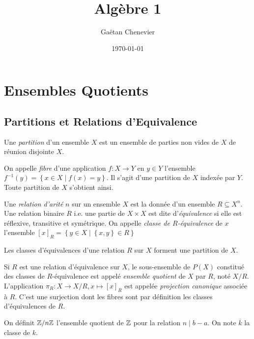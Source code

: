 \documentclass{cours}
\title{Algèbre 1}
\author{Gaëtan Chenevier}
\date{\today}
\begin{document}
\newpage
\section{Ensembles Quotients}
\subsection{Partitions et Relations d'Equivalence}
\begin{definition}
    Une \emph{partition} d'un ensemble $X$ est un ensemble de parties non vides de $X$ de réunion disjointe $X$. 
\end{definition}
\begin{definition}
    On appelle \emph{fibre} d'une application $f : X \rightarrow Y$ en $y \in Y$ l'ensemble $f^{-1}(y) = \left\{x \in X \mid f(x) = y\right\}$. Il s'agit d'une partition de $X$ indexée par $Y$. Toute partition de $X$ s'obtient ainsi. 
\end{definition}

\begin{definition}
    Une \emph{relation d'arité} $n$ sur un ensemble $X$ est la donnée d'un ensemble $R \subseteq X^{n}$. Une relation binaire $R$ i.e. une partie de $X\times X$ est dite d'\emph{équivalence} si elle est réflexive, transitive et symétrique. On appelle \emph{classe de $R$-équivalence} de $x$ l'ensemble $\left[x\right]_{R} = \left\{y \in X \mid \left\{x, y\right\} \in R\right\}$
\end{definition}

\begin{proposition}\label{partclassdeq}
    Les classes d'équivalences d'une relation $R$ sur $X$ forment une partition de $X$. 
\end{proposition}

\begin{definition}
    Si $R$ est une relation d'équivalence sur $X$, le sous-ensemble de $P(X)$ constitué des classes de $R$-équivalence est appelé \emph{ensemble quotient} de $X$ par $R$, noté $X/R$. L'application $\pi_{R} : X \rightarrow X/R, x \mapsto \left[x\right]_{R}$ est appelée \emph{projection canonique} associée à $R$. C'est une surjection dont les fibres sont par définition les classes d'équivalences de $R$.
\end{definition}

\begin{example}
    On définit $\mathbb{Z}/n\mathbb{Z}$ l'ensemble quotient de $\mathbb{Z}$ pour la relation $n \mid b - a$. On note $\overline{k}$ la classe de $k$.
\end{example}
\end{document}
